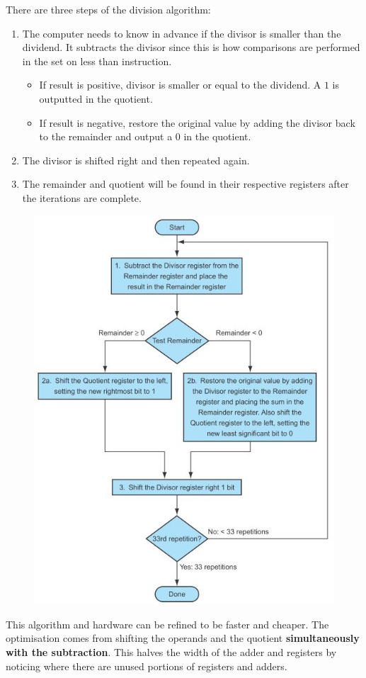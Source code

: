 \documentclass[10pt,a4paper]{article}
\begin{document}
There are three steps of the division algorithm:
\begin{enumerate}
    \item The computer needs to know in advance if the divisor is smaller than the dividend. It
    subtracts the divisor since this is how comparisons are performed in the set on less than instruction.
    \begin{itemize}
        \item If result is positive, divisor is smaller or equal to the dividend. A $1$ is outputted in 
        the quotient.
        \item If result is negative, restore the original value by adding the divisor back to the
        remainder and output a $0$ in the quotient.
    \end{itemize}
    \item The divisor is shifted right and then repeated again.
    \item The remainder and quotient will be found in their respective registers after the iterations are complete.
\end{enumerate}     
\begin{figure} [h!]
    \centering
    \includegraphics[scale=0.8]{Division flow.JPG}
\end{figure}
This algorithm and hardware can be refined to be faster and cheaper. The optimisation comes from
shifting the operands and the quotient \textbf{simultaneously with the subtraction}. This halves the
width of the adder and registers by noticing where there are unused portions of registers and
adders. 
\end{document}
